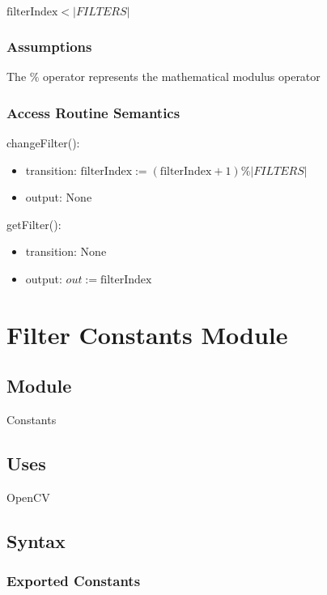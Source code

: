 \documentclass[12pt, titlepage]{article}
\begin{document}
$\text{filterIndex} < |FILTERS|$

\subsubsection* {Assumptions}

The $\%$ operator represents the mathematical modulus operator

\subsubsection* {Access Routine Semantics}

changeFilter():
\begin{itemize}
\item transition: $\text{filterIndex} := (\text{filterIndex} + 1) \% |FILTERS|$
\item output: None

\end{itemize}

\noindent getFilter():
\begin{itemize}
\item transition: None
\item output: $out := \text{filterIndex}$
\end{itemize}

\newpage

\section* {Filter Constants Module}

\subsection*{Module}

Constants

\subsection* {Uses}

OpenCV

\subsection* {Syntax}

\subsubsection* {Exported Constants}
\end{document}
